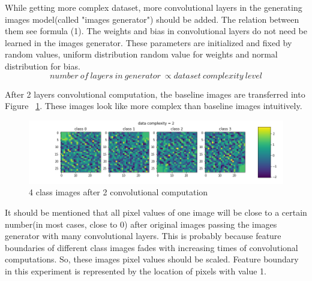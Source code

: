 \documentclass{article}
\begin{document}
While getting more complex dataset, more convolutional layers in the generating images model(called "images generator") should be added. The relation between them see formula (1). The weights and bias in convolutional layers do not need be learned in the images generator. These parameters are initialized and fixed by random values, uniform distribution random value for weights and normal distribution for bias.
\begin{equation}
    number\ of\ layers\ in\ generator\ \propto dataset\ complexity\ level
\end{equation}

After 2 layers convolutional computation, the baseline images are transferred into Figure~ \ref{fig:more_complex_image}. These images look like more complex than baseline images intuitively.
\begin{figure}[h]
    \centering
    \includegraphics[width=1\linewidth]{demo-2.png}
    \caption{\small 4 class images after 2 convolutional computation}
    \label{fig:more_complex_image}
\end{figure}

It should be mentioned that all pixel values of one image will be close to a certain number(in most cases, close to 0) after original images passing the images generator with many convolutional layers. This is probably because feature boundaries of different class images fades with increasing times of convolutional computations. So, these images pixel values should be scaled. Feature boundary in this experiment is represented by the location of pixels with value 1.
\end{document}
